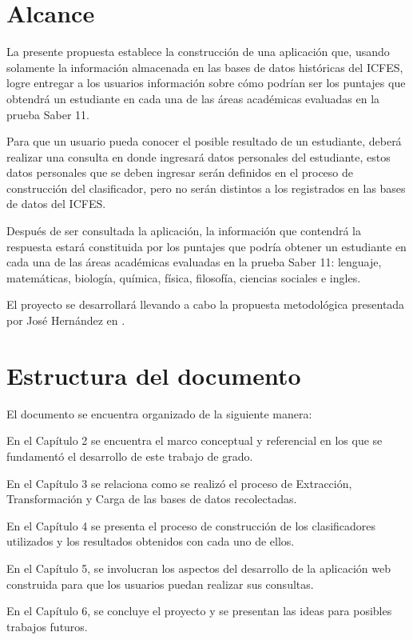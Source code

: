 \section{Alcance}
La presente propuesta establece la construcción de una aplicación que, usando solamente la información almacenada en las bases de datos históricas del ICFES, logre entregar a los usuarios información sobre cómo podrían ser los puntajes que obtendrá un estudiante en cada una de las áreas académicas evaluadas en la prueba Saber 11\degree. 

Para que un usuario pueda conocer el posible resultado de un estudiante, deberá realizar una consulta en donde ingresará datos personales del estudiante, estos datos personales que se deben ingresar serán definidos en el proceso de construcción del clasificador, pero no serán distintos a los registrados en las bases de datos del ICFES.

Después de ser consultada la aplicación, la información que contendrá la respuesta estará constituida por los puntajes que podría obtener un estudiante en cada una de las áreas académicas evaluadas en la prueba Saber 11\degree: lenguaje, matemáticas, biología, química, física, filosofía, ciencias sociales e ingles.

El proyecto se desarrollará llevando a cabo la propuesta metodológica presentada por José Hernández en \cite{key-50}.
\section{Estructura del documento}
El documento se encuentra organizado de la siguiente manera:

En el Capítulo 2 se encuentra el marco conceptual y referencial en los que se fundamentó el desarrollo de este trabajo de grado.

En el Capítulo 3 se relaciona como se realizó el proceso de Extracción, Transformación y Carga de las bases de datos recolectadas.

En el Capítulo 4 se presenta el proceso de construcción de los clasificadores utilizados y los resultados obtenidos con cada uno de ellos.

En el Capítulo 5, se involucran los aspectos del desarrollo de la aplicación web construida para que los usuarios puedan realizar sus consultas.

En el Capítulo 6, se concluye el proyecto y se presentan las ideas para posibles trabajos futuros.